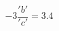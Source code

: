 \documentclass[preview]{standalone}
\begin{document}
\begin{align*}
-3 \dfrac{'b'}{'c'}= 3.4
\end{align*}
\end{document}
